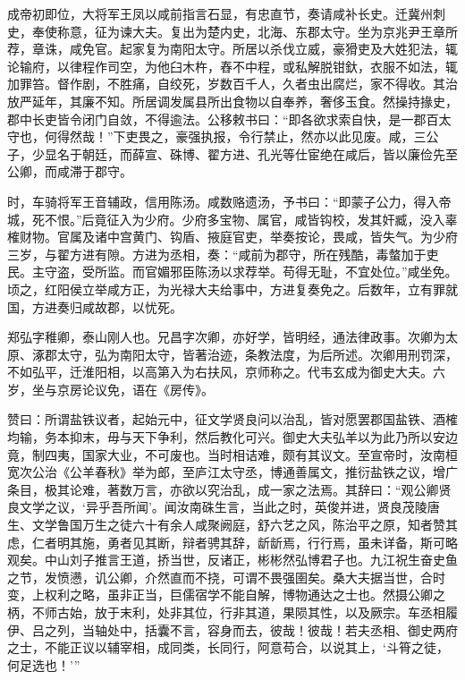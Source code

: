 \documentclass[12pt,UTF8]{ctexbook}
\begin{document}
成帝初即位，大将军王凤以咸前指言石显，有忠直节，奏请咸补长史。迁冀州刺史，奉使称意，征为谏大夫。复出为楚内史，北海、东郡太守。坐为京兆尹王章所荐，章诛，咸免官。起家复为南阳太守。所居以杀伐立威，豪猾吏及大姓犯法，辄论输府，以律程作司空，为他臼木杵，舂不中程，或私解脱钳釱，衣服不如法，辄加罪笞。督作剧，不胜痛，自绞死，岁数百千人，久者虫出腐烂，家不得收。其治放严延年，其廉不知。所居调发属县所出食物以自奉养，奢侈玉食。然操持掾史，郡中长吏皆令闭门自敛，不得逾法。公移敕书曰：“即各欲求索自快，是一郡百太守也，何得然哉！”下吏畏之，豪强执报，令行禁止，然亦以此见废。咸，三公子，少显名于朝廷，而薛宣、硃博、翟方进、孔光等仕宦绝在咸后，皆以廉俭先至公卿，而咸滞于郡守。



时，车骑将军王音辅政，信用陈汤。咸数赂遗汤，予书曰：“即蒙子公力，得入帝城，死不恨。”后竟征入为少府。少府多宝物、属官，咸皆钩校，发其奸臧，没入辜榷财物。官属及诸中宫黄门、钩盾、掖庭官吏，举奏按论，畏咸，皆失气。为少府三岁，与翟方进有隙。方进为丞相，奏：“咸前为郡守，所在残酷，毒螫加于吏民。主守盗，受所监。而官媚邪臣陈汤以求荐举。苟得无耻，不宜处位。”咸坐免。顷之，红阳侯立举咸方正，为光禄大夫给事中，方进复奏免之。后数年，立有罪就国，方进奏归咸故郡，以忧死。



郑弘字稚卿，泰山刚人也。兄昌字次卿，亦好学，皆明经，通法律政事。次卿为太原、涿郡太守，弘为南阳太守，皆著治迹，条教法度，为后所述。次卿用刑罚深，不如弘平，迁淮阳相，以高第入为右扶风，京师称之。代韦玄成为御史大夫。六岁，坐与京房论议免，语在《房传》。



赞曰：所谓盐铁议者，起始元中，征文学贤良问以治乱，皆对愿罢郡国盐铁、酒榷均输，务本抑末，毋与天下争利，然后教化可兴。御史大夫弘羊以为此乃所以安边竟，制四夷，国家大业，不可废也。当时相诘难，颇有其议文。至宣帝时，汝南桓宽次公治《公羊春秋》举为郎，至庐江太守丞，博通善属文，推衍盐铁之议，增广条目，极其论难，著数万言，亦欲以究治乱，成一家之法焉。其辞曰：“观公卿贤良文学之议，‘异乎吾所闻’。闻汝南硃生言，当此之时，英俊并进，贤良茂陵唐生、文学鲁国万生之徒六十有余人咸聚阙庭，舒六艺之风，陈治平之原，知者赞其虑，仁者明其施，勇者见其断，辩者骋其辞，龂龂焉，行行焉，虽未详备，斯可略观矣。中山刘子推言王道，挢当世，反诸正，彬彬然弘博君子也。九江祝生奋史鱼之节，发愤懑，讥公卿，介然直而不挠，可谓不畏强圉矣。桑大夫据当世，合时变，上权利之略，虽非正当，巨儒宿学不能自解，博物通达之士也。然摄公卿之柄，不师古始，放于末利，处非其位，行非其道，果陨其性，以及厥宗。车丞相履伊、吕之列，当轴处中，括囊不言，容身而去，彼哉！彼哉！若夫丞相、御史两府之士，不能正议以辅宰相，成同类，长同行，阿意苟合，以说其上，‘斗筲之徒，何足选也！’”
\end{document}
